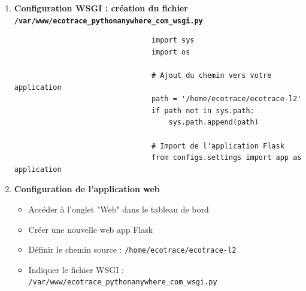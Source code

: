 \documentclass[a4paper,11pt]{article}
\begin{document}
\begin{enumerate}
                    \item \textbf{Configuration WSGI : création du fichier \texttt{/var/www/ecotrace\_pythonanywhere\_com\_wsgi.py}}
                        \begin{tcolorbox}[colback=lightgray!6, colframe=black, left=-50mm, right=5mm, top=2mm, bottom=0mm, boxrule=0.1mm]
                            \begin{verbatim}
                                import sys
                                import os

                                # Ajout du chemin vers votre application
                                path = '/home/ecotrace/ecotrace-l2'
                                if path not in sys.path:
                                    sys.path.append(path)

                                # Import de l'application Flask
                                from configs.settings import app as application
                            \end{verbatim}
                        \end{tcolorbox}

                    \item \textbf{Configuration de l'application web}
                        \begin{itemize}
                            \item Accéder à l'onglet "Web" dans le tableau de bord
                            \item Créer une nouvelle web app Flask
                            \item Définir le chemin source : \texttt{/home/ecotrace/ecotrace-l2}
                            \item Indiquer le fichier WSGI : \texttt{/var/www/ecotrace\_pythonanywhere\_com\_wsgi.py}
                        \end{itemize}


\end{enumerate}
\end{document}
